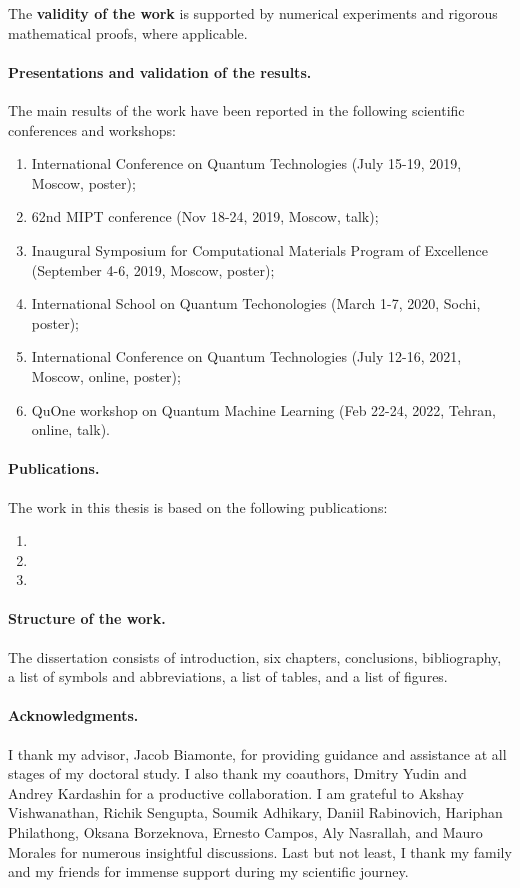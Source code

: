 The \textbf{validity of the work} is supported by numerical experiments and rigorous mathematical proofs, where applicable.

\paragraph{Presentations and validation of the results.}
The main results of the work have been reported in the following scientific conferences and workshops:

\begin{enumerate}
    \item International Conference on Quantum Technologies (July 15-19, 2019, Moscow, poster);
    \item 62nd MIPT conference (Nov 18-24, 2019, Moscow, talk);
    \item Inaugural Symposium for Computational Materials Program of Excellence (September 4-6, 2019, Moscow, poster);
    \item International School on Quantum Techonologies (March 1-7, 2020, Sochi, poster);
    \item International Conference on Quantum Technologies (July 12-16, 2021, Moscow, online, poster);
    \item QuOne workshop on Quantum Machine Learning (Feb 22-24, 2022, Tehran, online, talk).
\end{enumerate}

\paragraph{Publications.}
The work in this thesis is based on the following publications:

\begin{enumerate}
    \item {}
    \item {}
    \item {}
\end{enumerate}

\paragraph{Structure of the work.} The dissertation consists of introduction, six chapters, conclusions, bibliography, a list of symbols and abbreviations, a list of tables, and a list of figures.

\paragraph{Acknowledgments.} I thank my advisor, Jacob Biamonte, for providing guidance and assistance at all stages of my doctoral study. I also thank my coauthors, Dmitry Yudin and Andrey Kardashin for a productive collaboration. I am grateful to Akshay Vishwanathan, Richik Sengupta, Soumik Adhikary, Daniil Rabinovich, Hariphan Philathong, Oksana Borzeknova, Ernesto Campos, Aly Nasrallah, and Mauro Morales for numerous insightful discussions. Last but not least, I thank my family and my friends for immense support during my scientific journey.

